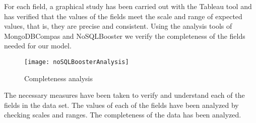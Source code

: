 For each field, a graphical study has been carried out with the Tableau tool and has verified that the values of the
fields meet the scale and range of expected values, that is, they are precise and consistent.
Using the analysis tools of MongoDBCompas and NoSQLBooster we verify the completeness of the fields needed for our model.
\begin{figure}[ht]
    \centering
    \texttt{[image: noSQLBoosterAnalysis]}
    \caption{Completeness analysis}
\end{figure}

\begin{itemize}
    \done The necessary measures have been taken to verify and understand each of the fields in the data set.
    \done The values of each of the fields have been analyzed by checking scales and ranges.
    \done The completeness of the data has been analyzed.
    
\end{itemize}
 \newpage